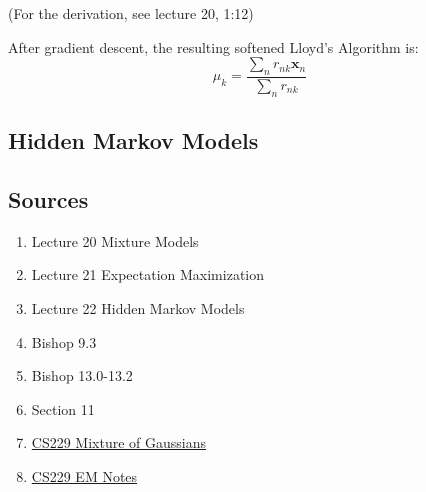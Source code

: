 \documentclass[11pt, oneside]{article}   	%
\begin{document}
(For the derivation, see lecture 20, 1:12)

After gradient descent, the resulting softened Lloyd's Algorithm is:
\[
\mu_k = \frac{\displaystyle{\sum_n r_{nk}\mathbf{x}_n}} {\displaystyle{\sum_n r_{nk}}}
\]



\subsection{Hidden Markov Models}

\subsection{Sources}

\begin{enumerate}
	\item Lecture 20 Mixture Models
	\item Lecture 21 Expectation Maximization
	\item Lecture 22 Hidden Markov Models
	\item Bishop 9.3
	\item Bishop 13.0-13.2
	\item Section 11
	\item \href{http://cs229.stanford.edu/notes/cs229-notes7b.pdf}{CS229 Mixture of Gaussians}
	\item \href{http://cs229.stanford.edu/notes/cs229-notes8.pdf}{CS229 EM Notes}
\end{enumerate}
\end{document}

